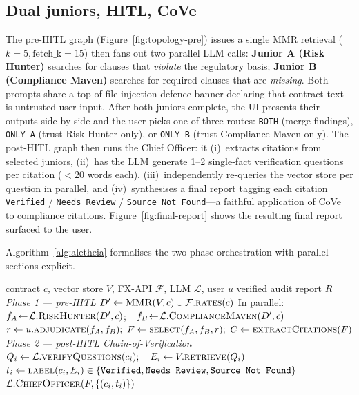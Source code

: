 \documentclass{article}
\begin{document}
\subsection{Dual juniors, HITL, CoVe}
\label{sec:dual-juniors}
The pre-HITL graph
(Figure~\ref{fig:topology-pre}) issues a single MMR retrieval
($k\!=\!5, \text{fetch\_k}\!=\!15$) then fans out two parallel LLM
calls: \textbf{Junior A (Risk Hunter)} searches for clauses that
\emph{violate} the regulatory basis; \textbf{Junior B (Compliance
Maven)} searches for required clauses that are \emph{missing}. Both
prompts share a top-of-file injection-defence banner declaring that
contract text is untrusted user input.
After both juniors complete, the UI presents their outputs side-by-side
and the user picks one of three routes: \texttt{BOTH} (merge findings),
\texttt{ONLY\_A} (trust Risk Hunter only), or \texttt{ONLY\_B} (trust
Compliance Maven only). The post-HITL graph then runs the Chief
Officer: it (i)~extracts citations from selected juniors, (ii)~has the
LLM generate 1--2 single-fact verification questions per citation
($<20$ words each), (iii)~independently re-queries the vector store
per question in parallel, and (iv)~synthesises a final report tagging
each citation \texttt{Verified} / \texttt{Needs Review} /
\texttt{Source Not Found}---a faithful application of
CoVe~\cite{dhuliawala2023chain} to compliance citations.
Figure~\ref{fig:final-report} shows the resulting final report
surfaced to the user.

Algorithm~\ref{alg:aletheia} formalises the two-phase orchestration
with parallel sections explicit.

\begin{algorithm}[!ht]
\caption{Aletheia end-to-end audit (LangGraph orchestration).}
\label{alg:aletheia}
\begin{algorithmic}[1]
\Require contract $c$, vector store $V$, FX-API $\mathcal{F}$, LLM $\mathcal{L}$, user $u$
\Ensure  verified audit report $R$
\Statex \textit{Phase 1 --- pre-HITL}
\State $D' \gets \textsc{MMR}(V, c) \cup \mathcal{F}.\textsc{rates}(c)$
\State In parallel: $f_A\!\gets\!\mathcal{L}.\textsc{RiskHunter}(D', c)$;\ \ $f_B\!\gets\!\mathcal{L}.\textsc{ComplianceMaven}(D', c)$
\State $r \gets u.\textsc{adjudicate}(f_A, f_B);\ F \gets \textsc{select}(f_A, f_B, r);\ C \gets \textsc{extractCitations}(F)$
\Statex \textit{Phase 2 --- post-HITL Chain-of-Verification}
  \State $Q_i \gets \mathcal{L}.\textsc{verifyQuestions}(c_i);\quad E_i \gets V.\textsc{retrieve}(Q_i)$
  \State $t_i \gets \textsc{label}(c_i, E_i) \in \{\texttt{Verified},\texttt{Needs Review},\texttt{Source Not Found}\}$
\EndFor
\State \Return $\mathcal{L}.\textsc{ChiefOfficer}(F, \{(c_i, t_i)\})$
\end{algorithmic}
\end{algorithm}
\end{document}
